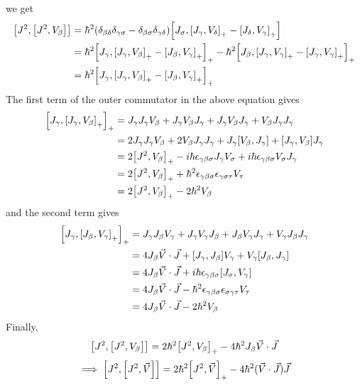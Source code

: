 \documentclass[12pt]{article}
\begin{document}
\begin{enumerate}[label=(\alph*)]
    we get
    \begin{align*}
        \comm{J^2}{\comm{J^2}{V_\beta}} &= \hbar^2(\delta_{\beta\delta}\delta_{\gamma\sigma} - \delta_{\beta\sigma}\delta_{\gamma\delta})\comm{J_\sigma}{\comm{J_\gamma}{V_\delta}_+ - \comm{J_\delta}{V_\gamma}_+} \\
        &= \hbar^2\comm{J_\gamma}{\comm{J_\gamma}{V_\beta}_+ - \comm{J_\beta}{V_\gamma}_+}_+ - \hbar^2\comm{J_\beta}{\comm{J_\gamma}{V_\gamma}_+ - \comm{J_\gamma}{V_\gamma}_+}_+ \\
        &= \hbar^2\comm{J_\gamma}{\comm{J_\gamma}{V_\beta}_+ - \comm{J_\beta}{V_\gamma}_+}_+
    \end{align*}
    The first term of the outer commutator in the above equation gives
    \begin{align*}
        \comm{J_\gamma}{\comm{J_\gamma}{V_\beta}_+}_+ &= J_\gamma J_\gamma V_\beta + J_\gamma V_\beta J_\gamma + J_\gamma V_\beta J_\gamma + V_\beta J_\gamma J_\gamma \\
        &= 2J_\gamma J_\gamma V_\beta + 2V_\beta J_\gamma J_\gamma + J_\gamma\comm{V_\beta}{J_\gamma} + \comm{J_\gamma}{V_\beta}J_\gamma \\
        &= 2\comm{J^2}{V_\beta}_+ - i\hbar\epsilon_{\gamma\beta\sigma}J_\gamma V_\sigma + i\hbar\epsilon_{\gamma\beta\sigma}V_\sigma J_\gamma \\
        &= 2\comm{J^2}{V_\beta}_+ + \hbar^2\epsilon_{\gamma\beta\sigma}\epsilon_{\gamma\sigma\tau}V_\tau \\
        &= 2\comm{J^2}{V_\beta}_+ - 2\hbar^2V_\beta
    \end{align*}
    and the second term gives
    \begin{align*}
        \comm{J_\gamma}{\comm{J_\beta}{V_\gamma}_+}_+ &= J_\gamma J_\beta V_\gamma + J_\gamma V_\gamma J_\beta + J_\beta V_\gamma J_\gamma + V_\gamma J_\beta J_\gamma \\
        &= 4J_\beta\vec{V}\cdot\vec{J} + \comm{J_\gamma}{J_\beta}V_\gamma + V_\gamma\comm{J_\beta}{J_\gamma} \\
        &= 4J_\beta\vec{V}\cdot\vec{J} + i\hbar\epsilon_{\gamma\beta\sigma}\comm{J_\sigma}{V_\gamma} \\
        &= 4J_\beta\vec{V}\cdot\vec{J} - \hbar^2\epsilon_{\gamma\beta\sigma}\epsilon_{\sigma\gamma\tau}V_\tau \\
        &= 4J_\beta\vec{V}\cdot\vec{J} - 2\hbar^2V_\beta
    \end{align*}
    Finally,
    \[ \comm{J^2}{\comm{J^2}{V_\beta}} = 2\hbar^2\comm{J^2}{V_\beta}_+ - 4\hbar^2J_\beta \vec{V}\cdot\vec{J} \]
    \[ \implies \comm{J^2}{\comm{J^2}{\vec{V}}} = 2\hbar^2\comm{J^2}{\vec{V}}_+ - 4\hbar^2(\vec{V}\cdot\vec{J})\vec{J} \]
\end{enumerate}
\end{document}
